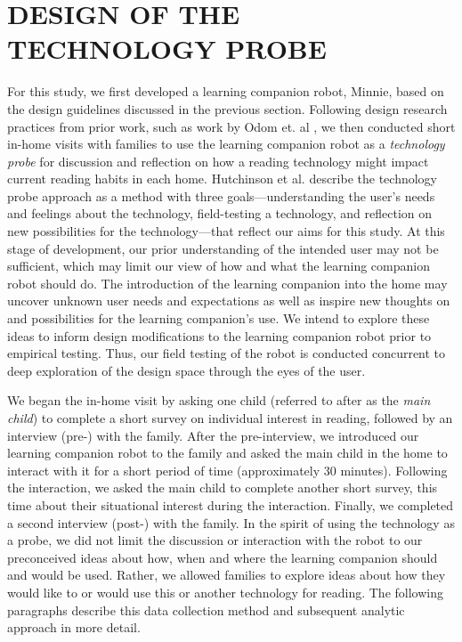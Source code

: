 \documentclass{sigchi}
\begin{document}
\section{DESIGN OF THE TECHNOLOGY PROBE}
 For this study, we first developed a learning companion robot, Minnie, based on the design guidelines discussed in the previous section. Following design research practices from prior work, such as work by Odom et. al \cite{Odom:2012}, we then conducted short in-home visits with families to use the learning companion robot as a \textit{technology probe} \cite{Hutchinson:2003} for discussion and reflection on how a reading technology might impact current reading habits in each home. Hutchinson et al. \cite{Hutchinson:2003} describe the technology probe approach as a method with three goals---understanding the user's needs and feelings about the technology, field-testing a technology, and reflection on new possibilities for the technology---that reflect our aims for this study. At this stage of development, our prior understanding of the intended user may not be sufficient, which may limit our view of how and what the learning companion robot should do. The introduction of the learning companion into the home may uncover unknown user needs and expectations as well as inspire new thoughts on and possibilities for the learning companion's use. We intend to explore these ideas to inform design modifications to the learning companion robot prior to empirical testing. Thus, our field testing of the robot is conducted concurrent to deep exploration of the design space through the eyes of the user.
 
 We began the in-home visit by asking one child (referred to after as the \textit{main child}) to complete a short survey on individual interest in reading, followed by an interview (pre-) with the family. After the pre-interview, we introduced our learning companion robot to the family and asked the main child in the home to interact with it for a short period of time (approximately 30 minutes). Following the interaction, we asked the main child to complete another short survey, this time about their situational interest during the interaction. Finally, we completed a second interview (post-) with the family. In the spirit of using the technology as a probe, we did not limit the discussion or interaction with the robot to our preconceived ideas about how, when and where the learning companion should and would be used. Rather, we allowed families to explore ideas about how they would like to or would use this or another technology for reading. The following paragraphs describe this data collection method and subsequent analytic approach in more detail.
 
\end{document}
